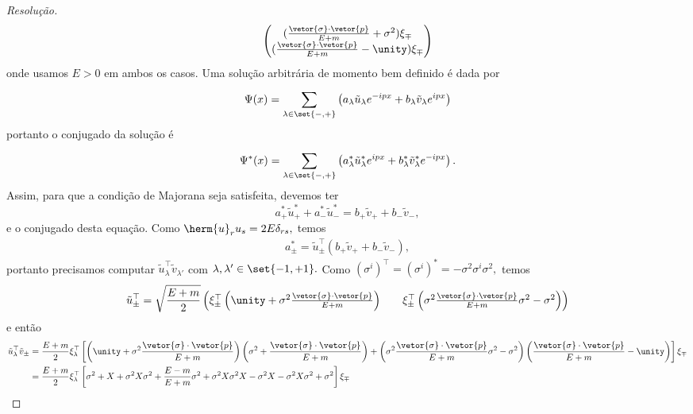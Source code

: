 \begin{proof}[Resolução]
\begin{equation*}
\begin{pmatrix}
            (\frac{\vetor{\sigma}\cdot\vetor{p}}{E + m} + \sigma^2) \xi_\mp\\
            (\frac{\vetor{\sigma}\cdot\vetor{p}}{E + m} - \unity) \xi_\mp
        \end{pmatrix}
    \end{equation*}
    onde usamos \(E > 0\) em ambos os casos. Uma solução arbitrária de momento bem definido é dada por
    \begin{equation*}
        \Psi(x) = \sum_{\lambda \in \set{-,+}}^{} \left(a_{\lambda} \tilde{u}_{\lambda} e^{-ipx} + b_{\lambda} \tilde{v}_{\lambda} e^{ipx}\right)
    \end{equation*}
    portanto o conjugado da solução é
    \begin{equation*}
        \Psi^*(x) = \sum_{\lambda \in \set{-,+}}^{} \left(a_{\lambda}^* \tilde{u}^*_{\lambda} e^{ipx} + b^*_{\lambda} \tilde{v}^*_{\lambda} e^{-ipx}\right).
    \end{equation*}
    Assim, para que a condição de Majorana seja satisfeita, devemos ter
    \begin{equation*}
        a^*_+ \tilde{u}^*_+ + a^*_- \tilde{u}^*_- = b_+ \tilde{v}_+ + b_- \tilde{v}_-,
    \end{equation*}
    e o conjugado desta equação. Como \(\herm{u}_r u_s = 2E \delta_{rs},\) temos
    \begin{align*}
        a_\pm^* = \tilde{u}^\top_\pm(b_+ \tilde{v}_+ + b_- \tilde{v}_-),
    \end{align*}
    portanto precisamos computar \(\tilde{u}^\top_{\lambda} \tilde{v}_{\lambda'}\) com \(\lambda, \lambda' \in \set{-1,+1}.\) Como \((\sigma^i)^\top = (\sigma^i)^* = -\sigma^2 \sigma^i \sigma^2,\) temos
    \begin{equation*}
        \tilde{u}^\top_{\pm} = \sqrt{\frac{E + m}{2}} \begin{pmatrix}
            \xi_{\pm}^\top \left(\unity + \sigma^2\frac{\vetor{\sigma}\cdot\vetor{p}}{E + m}\right) &&
            \xi_{\pm}^\top \left(\sigma^2 \frac{\vetor{\sigma}\cdot\vetor{p}}{E + m}\sigma^2-\sigma^2\right)
        \end{pmatrix}
    \end{equation*}
    e então
    \begin{align*}
        \tilde{u}^\top_{\lambda} \tilde{v}_{\pm} &= \frac{E + m}{2}\xi^\top_{\lambda}\left[\left(\unity + \sigma^2\frac{\vetor{\sigma}\cdot\vetor{p}}{E + m}\right)\left(\sigma^2 + \frac{\vetor{\sigma}\cdot\vetor{p}}{E + m}\right) + \left(\sigma^2 \frac{\vetor{\sigma}\cdot\vetor{p}}{E + m} \sigma^2 - \sigma^2\right)\left(\frac{\vetor{\sigma}\cdot\vetor{p}}{E + m} - \unity\right)\right]\xi_{\mp}\\
                                                 &= \frac{E + m}{2} \xi^\top_{\lambda} \left[\sigma^2 + X + \sigma^2 X\sigma^2 + \frac{E - m}{E + m}\sigma^2 + \sigma^2 X \sigma^2 X - \sigma^2 X - \sigma^2 X \sigma^2 + \sigma^2\right]\xi_{\mp}
    \end{align*}
\end{proof}
